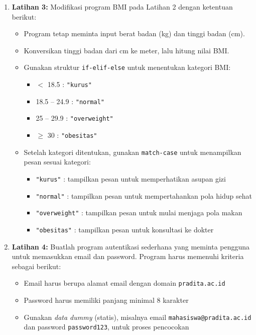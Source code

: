 \begin{enumerate}
\item \textbf{Latihan 3:} Modifikasi program BMI pada Latihan 2 dengan ketentuan berikut:
\begin{itemize}
    \item Program tetap meminta input berat badan (kg) dan tinggi badan (cm).
    \item Konversikan tinggi badan dari cm ke meter, lalu hitung nilai BMI.
    \item Gunakan struktur \texttt{if-elif-else} untuk menentukan kategori BMI:
    \begin{itemize}
        \item $<$ 18.5 : \texttt{"kurus"}
        \item 18.5 -- 24.9 : \texttt{"normal"}
        \item 25 -- 29.9 : \texttt{"overweight"}
        \item $\geq$ 30 : \texttt{"obesitas"}
    \end{itemize}
    \item Setelah kategori ditentukan, gunakan \texttt{match-case} untuk menampilkan pesan sesuai kategori:
    \begin{itemize}
        \item \texttt{"kurus"} : tampilkan pesan untuk memperhatikan asupan gizi
        \item \texttt{"normal"} : tampilkan pesan untuk mempertahankan pola hidup sehat
        \item \texttt{"overweight"} : tampilkan pesan untuk mulai menjaga pola makan
        \item \texttt{"obesitas"} : tampilkan pesan untuk konsultasi ke dokter
    \end{itemize}
\end{itemize}


\item \textbf{Latihan 4:} Buatlah program autentikasi sederhana yang meminta pengguna untuk memasukkan email dan password. Program harus memenuhi kriteria sebagai berikut:
\begin{itemize}
    \item Email harus berupa alamat email dengan domain \texttt{pradita.ac.id}
    \item Password harus memiliki panjang minimal 8 karakter
    \item Gunakan \textit{data dummy} (statis), misalnya email \texttt{mahasiswa@pradita.ac.id} dan password \texttt{password123}, untuk proses pencocokan
\end{itemize}


\end{enumerate}

